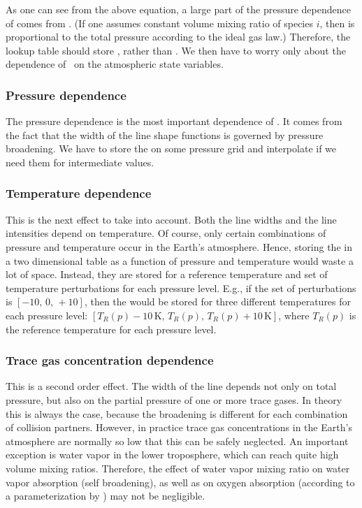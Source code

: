 As one can see from the above equation, a large part of the pressure
dependence of  comes from . (If one assumes
constant volume mixing ratio of species $i$, then  is
proportional to the total pressure according to the ideal gas law.) 
Therefore, the lookup table should store \AbsXsec, rather than
\AbsCoef. We then have to worry only about the dependence of \AbsXsec\
on the atmospheric state variables.

\subsubsection{Pressure dependence}

The pressure dependence is the most important dependence of
\AbsXsec. It comes from the fact that the width of the line shape
functions is governed by pressure broadening. We have to store the
\aAbsXsec{i} on some pressure grid and interpolate if we need them for
intermediate values.

\subsubsection{Temperature dependence}

This is the next effect to take into account. Both the line widths and
the line intensities depend on temperature. Of course, only certain
combinations of pressure and temperature occur in the Earth's
atmosphere. Hence, storing the  in a two dimensional table
as a function of pressure and temperature would waste a lot of space.
Instead, they are stored for a reference temperature and set of
temperature perturbations for each pressure level. E.g., if the set of
perturbations is $[-10,\, 0,\, +10]$, then the \aAbsXsec{i} would be stored
for three different temperatures for each pressure level:
$[T_R(p)-10\,\mbox{K},\, T_R(p),\, T_R(p)+10\,\mbox{K}]$, where
$T_R(p)$ is the reference temperature for each pressure level.

\subsubsection{Trace gas concentration dependence}

This is a second order effect. The width of the line depends not only
on total pressure, but also on the partial pressure of one or more
trace gases. In theory this is always the case, because the broadening
is different for each combination of collision partners. However, in
practice trace gas concentrations in the Earth's atmosphere are
normally so low that this can be safely neglected. An important
exception is water vapor in the lower troposphere, which can reach
quite high volume mixing ratios. Therefore, the effect of water vapor
mixing ratio on water vapor absorption (self broadening), as well as
on oxygen absorption (according to a parameterization by
\citet{pwr:93}) may not be negligible.

